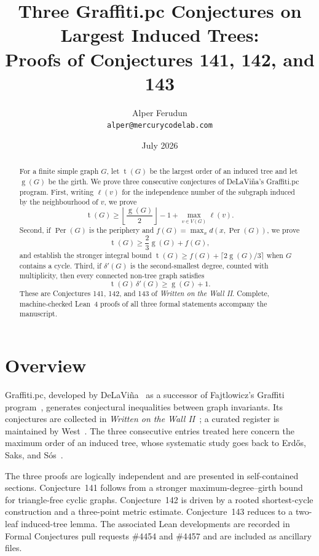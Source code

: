 \documentclass[11pt]{article}
\title{Three Graffiti.pc Conjectures on Largest Induced Trees:\\
Proofs of Conjectures 141, 142, and 143}
\author{Alper Ferudun\\\texttt{alper@mercurycodelab.com}}
\date{July 2026}
\numberwithin{equation}{section}
\theoremstyle{remark}
\newcommand{\tr}{\operatorname{t}}
\newcommand{\gr}{\operatorname{g}}
\newcommand{\lv}{\ell}
\newcommand{\Per}{\operatorname{Per}}
\newcommand{\dd}{\delta'}
\begin{document}
\maketitle

\begin{abstract}
For a finite simple graph $G$, let $\tr(G)$ be the largest order of an induced
tree and let $\gr(G)$ be the girth.  We prove three consecutive conjectures of
DeLaVi\~na's Graffiti.pc program.  First, writing $\lv(v)$ for the
independence number of the subgraph induced by the neighbourhood of $v$, we
prove
\[
 \tr(G)\ge \left\lfloor\frac{\gr(G)}2\right\rfloor-1+
 \max_{v\in V(G)}\lv(v).
\]
Second, if $\Per(G)$ is the periphery and
$f(G)=\max_x d(x,\Per(G))$, we prove
\[
 \tr(G)\ge \frac23\gr(G)+f(G),
\]
and establish the stronger integral bound
$\tr(G)\ge f(G)+\lceil2\gr(G)/3\rceil$ when $G$ contains a cycle.
Third, if $\dd(G)$ is the second-smallest degree, counted with multiplicity,
then every connected non-tree graph satisfies
\[
 \tr(G)\,\dd(G)\ge \gr(G)+1.
\]
These are Conjectures 141, 142, and 143 of \emph{Written on the Wall II}.
Complete, machine-checked Lean~4 proofs of all three formal statements
accompany the manuscript.
\end{abstract}

\tableofcontents

\section{Overview}
Graffiti.pc, developed by DeLaVi\~na~\cite{DeL01,DeLhistory} as a successor of
Fajtlowicz's Graffiti program~\cite{Faj88}, generates conjectural inequalities
between graph invariants.  Its conjectures are collected in \emph{Written on
the Wall II}~\cite{WOWII}; a curated register is maintained by
West~\cite{WestReg}.  The three consecutive entries treated here concern the
maximum order of an induced tree, whose systematic study goes back to
Erd\H{o}s, Saks, and S\'os~\cite{ESS86}.

The three proofs are logically independent and are presented in self-contained
sections.  Conjecture~141 follows from a stronger maximum-degree--girth bound
for triangle-free cyclic graphs.  Conjecture~142 is driven by a rooted
shortest-cycle construction and a three-point metric estimate.  Conjecture~143
reduces to a two-leaf induced-tree lemma.  The associated Lean developments
are recorded in Formal Conjectures pull requests \#4454 and \#4457
\cite{FC4454,FC4457} and are included as ancillary files.
\end{document}
